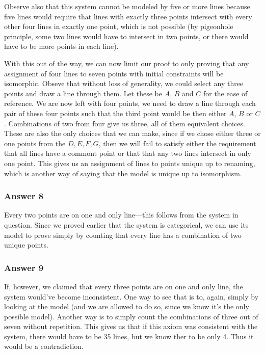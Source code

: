 \documentclass[11pt]{article}
\begin{document}
Observe also that this system cannot be modeled by five or more lines
because five lines would require that lines with exactly three points
intersect with every other four lines in exactly one point, which is
not possible (by pigeonhole principle, some two lines would have to
intersect in two points, or there would have to be more points in each
line).

With this out of the way, we can now limit our proof to only proving
that any assignment of four lines to seven points with initial constraints
will be isomorphic.  Obseve that without loss of generality, we could
select any three points and draw a line through them.  Let these be
$A$, $B$ and $C$ for the ease of reference.  We are now left with
four points, we need to draw a line through each pair of these four
points such that the third point would be then either $A$, $B$ or $C$.
Combinations of two from four give us three, all of them equivalent
choices.  These are also the only choices that we can make, since if
we chose either three or one points from the $D,E,F,G$, then we will
fail to satisfy either the requirement that all lines have a commont
point or that that any two lines intersect in only one point.
This gives us an assignment of lines to points unique up to renaming,
which is another way of saying that the model is unique up to isomorphism.
\subsubsection{Answer 8}
\label{sec-1-2-4}
Every two points are on one and only line---this follows from the system
in question.  Since we proved earlier that the system is categorical,
we can use its model to prove simply by counting that every line has
a combination of two unique points.
\subsubsection{Answer 9}
\label{sec-1-2-5}
If, however, we claimed that every three points are on one and only
line, the system would've become inconsistent.  One way to see that
is to, again, simply by looking at the model (and we are allowed to
do so, since we know it's the only possible model).  Another way
is to simply count the combinations of three out of seven without
repetition.  This gives us that if this axiom was consistent with
the system, there would have to be 35 lines, but we know ther to be
only 4.  Thus it would be a contradiction.
\end{document}
